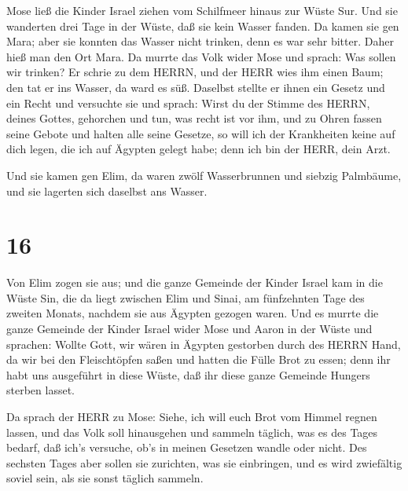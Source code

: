  Mose ließ die Kinder Israel ziehen vom Schilfmeer hinaus
zur Wüste Sur. Und sie wanderten drei Tage in der Wüste, daß sie kein
Wasser fanden.  Da kamen sie gen Mara; aber sie konnten das
Wasser nicht trinken, denn es war sehr bitter. Daher hieß man den Ort
Mara.  Da murrte das Volk wider Mose und sprach: Was sollen
wir trinken?  Er schrie zu dem HERRN, und der HERR wies ihm
einen Baum; den tat er ins Wasser, da ward es süß. Daselbst stellte er
ihnen ein Gesetz und ein Recht und versuchte sie  und
sprach: Wirst du der Stimme des HERRN, deines Gottes, gehorchen und tun,
was recht ist vor ihm, und zu Ohren fassen seine Gebote und halten alle
seine Gesetze, so will ich der Krankheiten keine auf dich legen, die ich
auf Ägypten gelegt habe; denn ich bin der HERR, dein Arzt.

 Und sie kamen gen Elim, da waren zwölf Wasserbrunnen und
siebzig Palmbäume, und sie lagerten sich daselbst ans Wasser.

\hypertarget{section-15}{%
\section{16}\label{section-15}}

 Von Elim zogen sie aus; und die ganze Gemeinde der Kinder
Israel kam in die Wüste Sin, die da liegt zwischen Elim und Sinai, am
fünfzehnten Tage des zweiten Monats, nachdem sie aus Ägypten gezogen
waren.  Und es murrte die ganze Gemeinde der Kinder Israel
wider Mose und Aaron in der Wüste  und sprachen: Wollte
Gott, wir wären in Ägypten gestorben durch des HERRN Hand, da wir bei
den Fleischtöpfen saßen und hatten die Fülle Brot zu essen; denn ihr
habt uns ausgeführt in diese Wüste, daß ihr diese ganze Gemeinde Hungers
sterben lasset.

 Da sprach der HERR zu Mose: Siehe, ich will euch Brot vom
Himmel regnen lassen, und das Volk soll hinausgehen und sammeln täglich,
was es des Tages bedarf, daß ich's versuche, ob's in meinen Gesetzen
wandle oder nicht.  Des sechsten Tages aber sollen sie
zurichten, was sie einbringen, und es wird zwiefältig soviel sein, als
sie sonst täglich sammeln.

